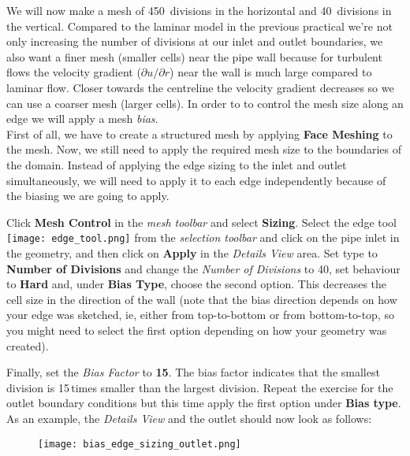 \documentclass[11pt,a4paper,oneside]{scrartcl}
\newcommand\bfr[1]{\textcolor[rgb]{1,0.00,0.00}{\textbf{\textsf{#1}}}}
\begin{document}
We will now make a mesh of 450~divisions in the horizontal and 40~divisions in the vertical. Compared to the laminar model in the previous practical we're not only increasing the number of divisions at our inlet and outlet boundaries, we also want a finer mesh (smaller cells) near the pipe wall because for turbulent flows the velocity gradient ($\partial u/\partial r$) near the wall is much large compared to laminar flow. Closer towards the centreline the velocity gradient decreases so we can use a coarser mesh (larger cells). In order to to control the mesh size along an edge we will apply a mesh \emph{bias}.\\

First of all, we have to create a structured mesh by applying \bfr{Face Meshing} to the mesh. Now, we still need to apply the required mesh size to the boundaries of the domain. Instead of applying the edge sizing to the inlet and outlet simultaneously, we will need to apply it to each edge independently because of the biasing we are going to apply.

Click \bfr{Mesh Control} in the \emph{mesh toolbar} and select \bfr{Sizing}. Select the edge tool \texttt{[image: edge\_tool.png]} from the \emph{selection toolbar} and click on the pipe inlet in the geometry, and then click on \bfr{Apply} in the \emph{Details View} area. Set type to \bfr{Number of Divisions} and change the {\it Number of Divisions} to 40, set behaviour to \bfr{Hard} and, under \bfr{Bias Type}, choose the second option. This decreases the cell size in the direction of the wall (note that the bias direction depends on how your edge was sketched, ie, either from top-to-bottom or from bottom-to-top, so you might need to select the first option depending on how your geometry was created).

Finally, set the {\it Bias Factor} to \bfr{15}. The bias factor indicates that the smallest division is 15\,times smaller than the largest division. Repeat the exercise for the outlet boundary conditions but this time apply the first option under \bfr{Bias type}. As an example, the \emph{Details View} and the outlet should now look as follows:

        \begin{figure}[H]
        \begin{center}
        \texttt{[image: bias\_edge\_sizing\_outlet.png]}
        \end{center}
        \end{figure}
\end{document}
